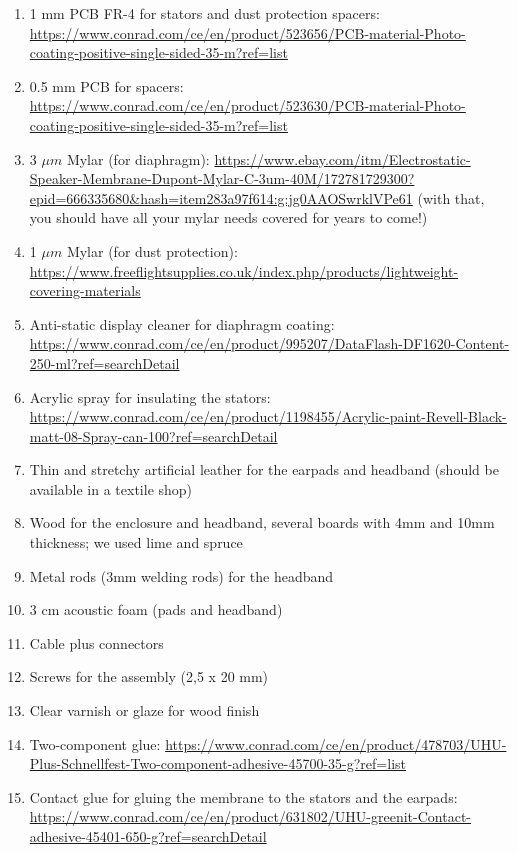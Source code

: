 \documentclass{article}
\begin{document}
\begin{enumerate}
    \item 1 mm PCB FR-4 for stators and dust protection spacers:  \url{https://www.conrad.com/ce/en/product/523656/PCB-material-Photo-coating-positive-single-sided-35-m?ref=list}
    \item 0.5 mm PCB for spacers: \url{https://www.conrad.com/ce/en/product/523630/PCB-material-Photo-coating-positive-single-sided-35-m?ref=list}
    \item 3 $\mu m$ Mylar (for diaphragm): \url{https://www.ebay.com/itm/Electrostatic-Speaker-Membrane-Dupont-Mylar-C-3um-40M/172781729300?epid=666335680&hash=item283a97f614:g:jg0AAOSwrklVPe61} (with that, you should have all your mylar needs covered for years to come!)
    \item 1 $\mu m$ Mylar (for dust protection): \url{https://www.freeflightsupplies.co.uk/index.php/products/lightweight-covering-materials}
    \item Anti-static display cleaner for diaphragm coating: \url{https://www.conrad.com/ce/en/product/995207/DataFlash-DF1620-Content-250-ml?ref=searchDetail}
    \item Acrylic spray for insulating the stators: \url{https://www.conrad.com/ce/en/product/1198455/Acrylic-paint-Revell-Black-matt-08-Spray-can-100?ref=searchDetail}
    \item Thin and stretchy artificial leather for the earpads and headband (should be available in a textile shop)
    \item Wood for the enclosure and headband, several boards with 4mm and 10mm thickness; we used lime and spruce
    \item Metal rods (3mm welding rods) for the headband
    \item 3 cm acoustic foam (pads and headband)
    \item Cable plus connectors
    \item Screws for the assembly (2,5 x 20 mm)
    \item Clear varnish or glaze for wood finish
    \item Two-component glue: \url{https://www.conrad.com/ce/en/product/478703/UHU-Plus-Schnellfest-Two-component-adhesive-45700-35-g?ref=list}
    \item Contact glue for gluing the membrane to the stators and the earpads: \url{https://www.conrad.com/ce/en/product/631802/UHU-greenit-Contact-adhesive-45401-650-g?ref=searchDetail}
    
\end{enumerate}
\end{document}
